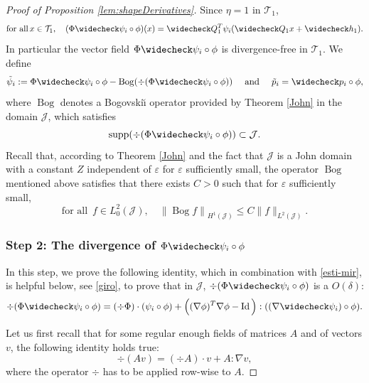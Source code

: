 \documentclass[10pt]{amsart}
\let\eps\varepsilon
\DeclareMathOperator{\Bog}{Bog}
\DeclareMathOperator{\Id}{Id}
\DeclareMathOperator{\supp}{supp}
\theoremstyle{definition}
\theoremstyle{remark}
\begin{document}
\begin{proof}[Proof of Proposition \ref{lem:shapeDerivatives}]
Since $\eta = 1$ in $\mathcal T_1$,
\begin{equation} \label{soliv-v}
\text{for all} \, x \in \mathcal T_1, \quad
(\Phi \widecheck \psi_i \circ \phi)(x) = \widecheck Q_1^T \psi_i (\widecheck Q_1 x + \widecheck h_1).
\end{equation}
In particular the vector field
$\Phi \widecheck \psi_i \circ \phi$ is divergence-free in $\mathcal T_1$.
We define
\begin{equation} \label{kejetrans}
\tilde \psi_i := \Phi \widecheck \psi_i \circ \phi - \Bog (\div (\Phi \widecheck \psi_i \circ \phi)) \quad \text{ and } \quad
\tilde p_i = \widecheck p_i \circ \phi,
\end{equation}
where $\Bog$ denotes a Bogovski\u{\i} operator provided by Theorem \ref{John} in the domain $\mathcal J$, which satisfies
\begin{equation}\label{support}
\supp(\div(\Phi \widecheck \psi_i \circ \phi)) \subset \mathcal J.
\end{equation}
Recall that, according to Theorem \ref{John} and the fact that
$\mathcal J$ is a John domain with a constant $Z$ independent of $\eps$ for $\eps$ sufficiently small, the operator $\Bog$ mentioned above satisfies that there exists $C>0$ such that for $\eps$ sufficiently small,
\begin{equation} \label{Bog-J}
\text{for all } \, f \in L^2_0(\mathcal J), \quad \left\|\Bog f\right\|_{H^1 (\mathcal J) } \leq C \|f \|_{L^2 (\mathcal J)}.
\end{equation}

\subsubsection*{Step 2: The divergence of $\Phi \widecheck \psi_i \circ \phi$} In this step, we prove the following identity, which in combination with \eqref{esti-mir}, is helpful below, see \eqref{giro}, to prove that in $\mathcal J$,
$\div (\Phi \widecheck \psi_i \circ \phi)$ is a $O(\delta)$:
\begin{equation}\label{idenden}
\div (\Phi \widecheck \psi_i \circ \phi) =
(\div \Phi) \cdot (\psi_i \circ \phi) +
\Big(
(\nabla \phi)^T \nabla \phi - \Id \Big) : ((\nabla \widecheck \psi_i) \circ \phi).
\end{equation}

Let us first recall that for some regular enough fields of matrices $A$ and of vectors $v$, the following identity holds true:
\begin{equation} \label{piola}
\div (Av) = (\div A) \cdot v + A : \nabla v,
\end{equation}
where the operator $\div$ has to be applied row-wise to $A$.


\end{proof}
\end{document}
